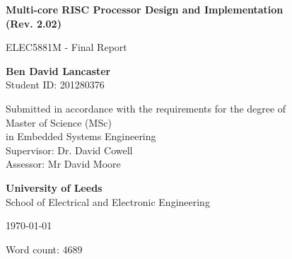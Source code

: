 \documentclass[11pt,a4paper]{report}
\begin{document}
\pagestyle{headings}

\begin{titlepage}
\begin{center}

\vspace*{2cm}
\Large

\textbf{
Multi-core RISC Processor Design and Implementation \\(Rev. 2.02)
}

\vspace{0.4cm}
\large
ELEC5881M - Final Report

\vspace{2cm}
\textbf{Ben David Lancaster}\\
Student ID: 201280376

\vspace{2cm}
Submitted in accordance with the requirements for the degree of\\
Master of Science (MSc)\\
in Embedded Systems Engineering\\

\vspace{2cm}
Supervisor: Dr. David Cowell\\
Assessor: Mr David Moore

\vspace{2cm}
\textbf{University of Leeds}\\
School of Electrical and Electronic Engineering

\vspace{1cm}
\today

\vspace{1cm}
Word count: 4689
\end{center}
\end{titlepage}

\end{document}

